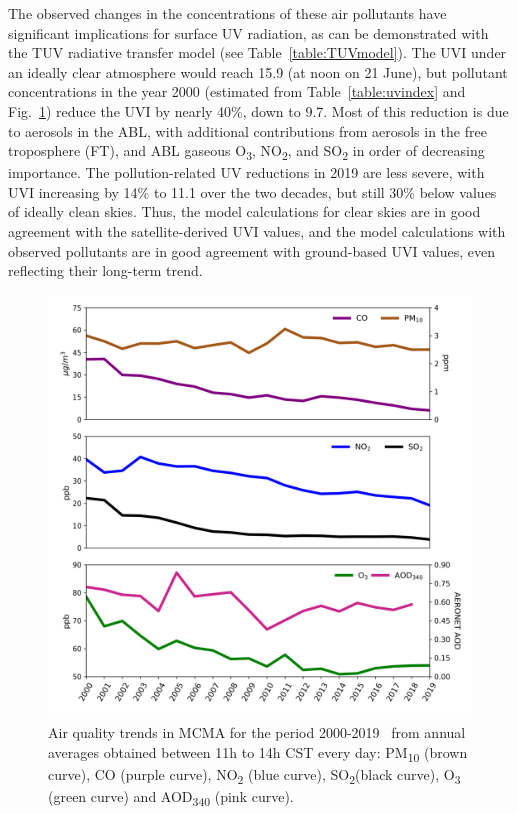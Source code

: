\documentclass[10pt]{article}
\begin{document}
The observed changes in the concentrations of these air pollutants have
significant implications for surface UV radiation, as can be
demonstrated with the TUV radiative transfer model (see
Table~{\ref{table:TUVmodel}}). The UVI under an ideally
clear atmosphere would reach 15.9 (at noon on 21 June), but pollutant
concentrations in the year 2000 (estimated from
Table~{\ref{table:uvindex}} and
Fig.~{\ref{829996}}) reduce the UVI by nearly 40\%,
down to 9.7. Most of this reduction is due to aerosols in the ABL, with
additional contributions from aerosols in the free troposphere (FT), and
ABL gaseous O\textsubscript{3}, NO\textsubscript{2}, and
SO\textsubscript{2} in order of decreasing importance. The
pollution-related UV reductions in 2019 are less severe, with UVI
increasing by 14\% to 11.1 over the two decades, but still 30\% below
values of ideally clean skies. Thus, the model calculations for clear
skies are in good agreement with the satellite-derived UVI values, and
the model calculations with observed pollutants are in good agreement
with ground-based UVI values, even reflecting their long-term trend.
\begin{figure}[H]
  \begin{center}
    \includegraphics[width=0.63\columnwidth]{figures/contCDMX/contCDMX}
    \caption{{Air quality trends in MCMA for the period 2000-2019~ from annual
    averages obtained between 11h to 14h CST every day: PM\textsubscript{10}
    (brown curve), CO (purple curve), NO\textsubscript{2} (blue curve),
    SO\textsubscript{2}(black curve), O\textsubscript{3} (green curve) and
    AOD\textsubscript{340} (pink curve).
    {\label{829996}}%
    }}
  \end{center}
\end{figure}
\end{document}
